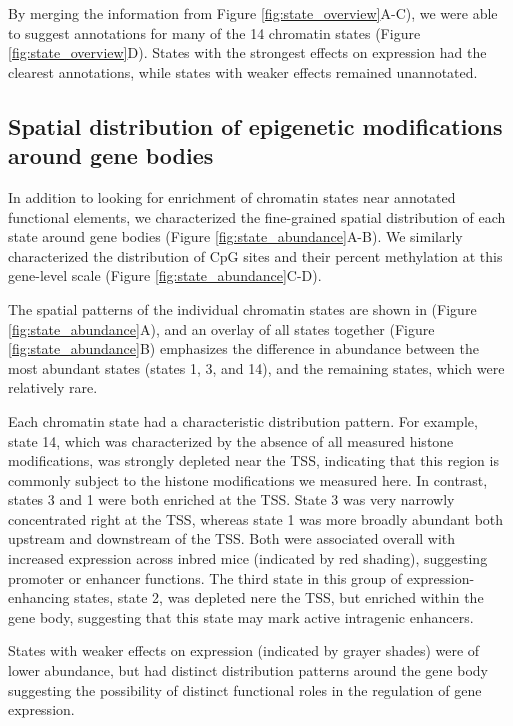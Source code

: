 \documentclass[10pt,letterpaper]{article}
\begin{document}
By merging the information from Figure \ref{fig:state_overview}A-C), we
were able to suggest annotations for many of the 14 chromatin states
(Figure \ref{fig:state_overview}D). States with the strongest effects on
expression had the clearest annotations, while states with weaker
effects remained unannotated.

\hypertarget{spatial-distribution-of-epigenetic-modifications-around-gene-bodies}{%
\subsection{Spatial distribution of epigenetic modifications around gene
bodies}\label{spatial-distribution-of-epigenetic-modifications-around-gene-bodies}}

In addition to looking for enrichment of chromatin states near annotated
functional elements, we characterized the fine-grained spatial
distribution of each state around gene bodies (Figure
\ref{fig:state_abundance}A-B). We similarly characterized the
distribution of CpG sites and their percent methylation at this
gene-level scale (Figure \ref{fig:state_abundance}C-D).

The spatial patterns of the individual chromatin states are shown in
(Figure \ref{fig:state_abundance}A), and an overlay of all states
together (Figure \ref{fig:state_abundance}B) emphasizes the difference
in abundance between the most abundant states (states 1, 3, and 14), and
the remaining states, which were relatively rare.

Each chromatin state had a characteristic distribution pattern. For
example, state 14, which was characterized by the absence of all
measured histone modifications, was strongly depleted near the TSS,
indicating that this region is commonly subject to the histone
modifications we measured here. In contrast, states 3 and 1 were both
enriched at the TSS. State 3 was very narrowly concentrated right at the
TSS, whereas state 1 was more broadly abundant both upstream and
downstream of the TSS. Both were associated overall with increased
expression across inbred mice (indicated by red shading), suggesting
promoter or enhancer functions. The third state in this group of
expression-enhancing states, state 2, was depleted nere the TSS, but
enriched within the gene body, suggesting that this state may mark
active intragenic enhancers.

States with weaker effects on expression (indicated by grayer shades)
were of lower abundance, but had distinct distribution patterns around
the gene body suggesting the possibility of distinct functional roles in
the regulation of gene expression.
\end{document}
